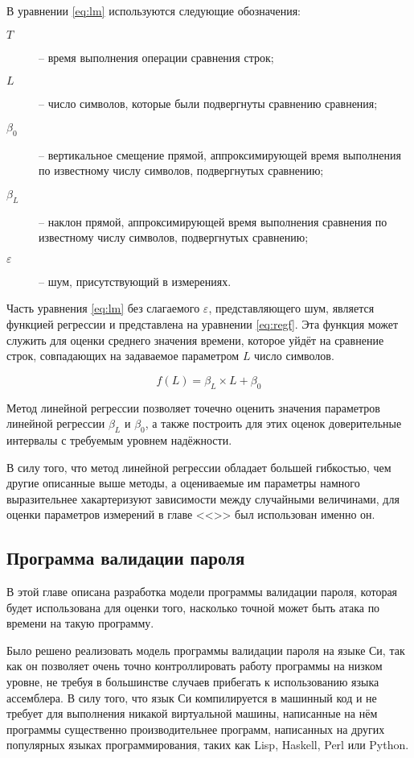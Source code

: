 В уравнении \ref{eq:lm} используются следующие обозначения:

\begin{description}
\item[$T$] -- время выполнения операции сравнения строк;
\item[$L$] -- число символов, которые были подвергнуты сравнению сравнения;
\item[$\beta_0$] -- вертикальное смещение прямой, аппроксимирующей время выполнения по известному числу символов, подвергнутых сравнению;
\item[$\beta_L$] -- наклон прямой, аппроксимирующей время выполнения сравнения по известному числу символов, подвергнутых сравнению;
\item[$\varepsilon$] -- шум, присутствующий в измерениях.
\end{description}

Часть уравнения \ref{eq:lm} без слагаемого $\varepsilon$, представляющего шум,
является функцией регрессии и представлена на уравнении \ref{eq:regf}. Эта функция
может служить для оценки среднего значения времени, которое уйдёт на сравнение
строк, совпадающих на задаваемое параметром $L$ число символов.

\nopagebreak

\begin{equation} \label{eq:regf}
f(L) = \beta_L \times L + \beta_0
\end{equation}

Метод линейной регрессии позволяет точечно оценить значения параметров линейной
регрессии $\beta_L$ и $\beta_0$, а также построить для этих оценок доверительные
интервалы с требуемым уровнем надёжности.

В силу того, что метод линейной регрессии обладает большей гибкостью, чем другие
описанные выше методы, а оцениваемые им параметры намного выразительнее хакартеризуют
зависимости между случайными величинами, для оценки параметров измерений в главе
<<>> был использован именно он.

\subsection{Программа валидации пароля} \label{sec:spec}

В этой главе описана разработка модели программы валидации пароля, которая будет
использована для оценки того, насколько точной может быть атака по времени на
такую программу.

Было решено реализовать модель программы валидации пароля на языке Си, так
как он позволяет очень точно контроллировать работу программы на низком
уровне, не требуя в большинстве случаев прибегать к использованию языка
ассемблера. В силу того, что язык Си компилируется в машинный код и не требует
для выполнения никакой виртуальной машины, написанные на нём программы
существенно производительнее программ, написанных на других популярных языках
программирования, таких как Lisp, Haskell, Perl или Python.

